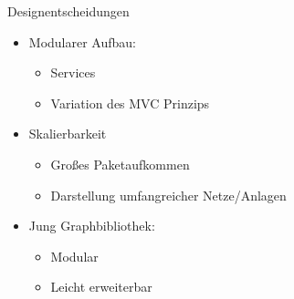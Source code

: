 \begin{frame}{Designentscheidungen}
    \begin{itemize}[<+->]
      \item Modularer Aufbau:
      \begin{itemize}
        \item Services
        \item Variation des MVC Prinzips
      \end{itemize}
      
      \item Skalierbarkeit
      \begin{itemize}
        \item Großes Paketaufkommen
        \item Darstellung umfangreicher Netze/Anlagen
      \end{itemize}
      
      \item Jung Graphbibliothek:
      \begin{itemize}
        \item Modular
        \item Leicht erweiterbar
      \end{itemize}
    \end{itemize}
\end{frame} 